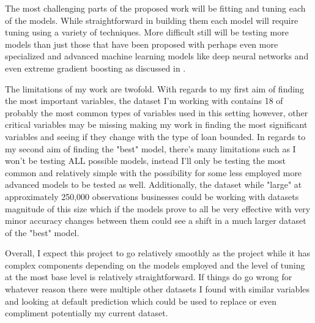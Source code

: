 \documentclass[12pt]{article}
\begin{document}
The most challenging parts of the proposed work will be fitting and tuning each of the models. While straightforward in building them each model will require tuning using a variety of techniques. More difficult still will be testing more models than just those that have been proposed with perhaps even more specialized and advanced machine learning models like deep neural networks and even extreme gradient boosting as discussed in \citet{lai2020loan}. 
\par The limitations of my work are twofold. With regards to my first aim of finding the most important variables, the dataset I'm working with contains 18 of probably the most common types of variables used in this setting however, other critical variables may be missing making my work in finding the most significant variables and seeing if they change with the type of loan bounded. In regards to my second aim of finding the "best" model, there's many limitations such as I won't be testing ALL possible models, instead I'll only be testing the most common and relatively simple with the possibility for some less employed more advanced models to be tested as well. Additionally, the dataset while "large" at approximately 250,000 observations businesses could be working with datasets magnitude of this size which if the models prove to all be very effective with very minor accuracy changes between them could see a shift in a much larger dataset of the "best" model.  
\par Overall, I expect this project to go relatively smoothly as the project while it has complex components depending on the models employed and the level of tuning at the most base level is relatively straightforward. If things do go wrong for whatever reason there were multiple other datasets I found with similar variables and looking at default prediction which could be used to replace or even compliment potentially my current dataset.



\end{document}
